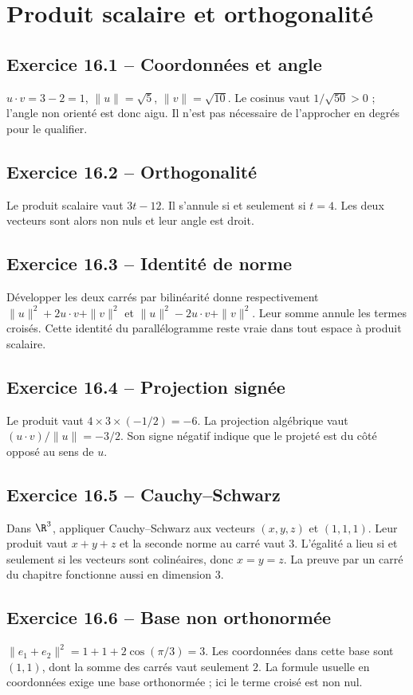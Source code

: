 \chapter{Produit scalaire et orthogonalité}
\section*{Exercice 16.1 -- Coordonnées et angle}
$u\cdot v=3-2=1$, $\|u\|=\sqrt5$, $\|v\|=\sqrt{10}$. Le cosinus vaut $1/\sqrt{50}>0$ ; l'angle non orienté est donc aigu. Il n'est pas nécessaire de l'approcher en degrés pour le qualifier.

\section*{Exercice 16.2 -- Orthogonalité}
Le produit scalaire vaut $3t-12$. Il s'annule si et seulement si $t=4$. Les deux vecteurs sont alors non nuls et leur angle est droit.

\section*{Exercice 16.3 -- Identité de norme}
Développer les deux carrés par bilinéarité donne respectivement $\|u\|^2+2u\cdot v+\|v\|^2$ et $\|u\|^2-2u\cdot v+\|v\|^2$. Leur somme annule les termes croisés. Cette identité du parallélogramme reste vraie dans tout espace à produit scalaire.

\section*{Exercice 16.4 -- Projection signée}
Le produit vaut $4\times3\times(-1/2)=-6$. La projection algébrique vaut $(u\cdot v)/\|u\|=-3/2$. Son signe négatif indique que le projeté est du côté opposé au sens de $u$.

\section*{Exercice 16.5 -- Cauchy--Schwarz}
Dans $\R^3$, appliquer Cauchy--Schwarz aux vecteurs $(x,y,z)$ et $(1,1,1)$. Leur produit vaut $x+y+z$ et la seconde norme au carré vaut $3$. L'égalité a lieu si et seulement si les vecteurs sont colinéaires, donc $x=y=z$. La preuve par un carré du chapitre fonctionne aussi en dimension $3$.

\section*{Exercice 16.6 -- Base non orthonormée}
$\|e_1+e_2\|^2=1+1+2\cos(\pi/3)=3$. Les coordonnées dans cette base sont $(1,1)$, dont la somme des carrés vaut seulement $2$. La formule usuelle en coordonnées exige une base orthonormée ; ici le terme croisé est non nul.
